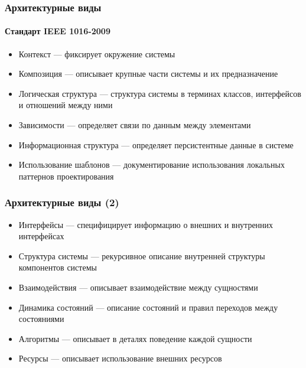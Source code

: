 \documentclass{../../slides-style}
\begin{document}
    \begin{frame}
        \frametitle{Архитектурные виды}
        \framesubtitle{Стандарт IEEE 1016-2009}
        \begin{itemize}
            \item Контекст --- фиксирует окружение системы
            \item Композиция --- описывает крупные части системы и их предназначение
            \item Логическая структура --- структура системы в терминах классов, интерфейсов и отношений между ними
            \item Зависимости --- определяет связи по данным между элементами
            \item Информационная структура --- определяет персистентные данные в системе
            \item Использование шаблонов --- документирование использования локальных паттернов проектирования
        \end{itemize}
    \end{frame}

    \begin{frame}
        \frametitle{Архитектурные виды (2)}
        \begin{itemize}
            \item Интерфейсы --- специфицирует информацию о внешних и внутренних интерфейсах
            \item Структура системы --- рекурсивное описание внутренней структуры компонентов системы
            \item Взаимодействия --- описывает взаимодействие между сущностями
            \item Динамика состояний --- описание состояний и правил переходов между состояниями
            \item Алгоритмы --- описывает в деталях поведение каждой сущности
            \item Ресурсы --- описывает использование внешних ресурсов
        \end{itemize}
    \end{frame}
\end{document}
